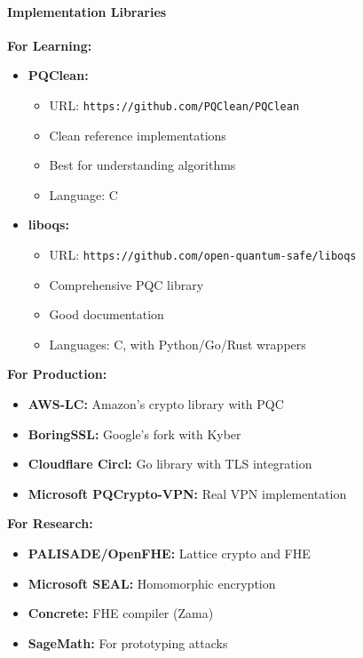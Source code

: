 \documentclass[11pt,a4paper]{article}
\begin{document}
\paragraph{Implementation Libraries}

\textbf{For Learning:}
\begin{itemize}
    \item \textbf{PQClean:}
    \begin{itemize}
        \item URL: \texttt{https://github.com/PQClean/PQClean}
        \item Clean reference implementations
        \item Best for understanding algorithms
        \item Language: C
    \end{itemize}
    
    \item \textbf{liboqs:}
    \begin{itemize}
        \item URL: \texttt{https://github.com/open-quantum-safe/liboqs}
        \item Comprehensive PQC library
        \item Good documentation
        \item Languages: C, with Python/Go/Rust wrappers
    \end{itemize}
\end{itemize}

\textbf{For Production:}
\begin{itemize}
    \item \textbf{AWS-LC:} Amazon's crypto library with PQC
    \item \textbf{BoringSSL:} Google's fork with Kyber
    \item \textbf{Cloudflare Circl:} Go library with TLS integration
    \item \textbf{Microsoft PQCrypto-VPN:} Real VPN implementation
\end{itemize}

\textbf{For Research:}
\begin{itemize}
    \item \textbf{PALISADE/OpenFHE:} Lattice crypto and FHE
    \item \textbf{Microsoft SEAL:} Homomorphic encryption
    \item \textbf{Concrete:} FHE compiler (Zama)
    \item \textbf{SageMath:} For prototyping attacks
\end{itemize}
\end{document}
